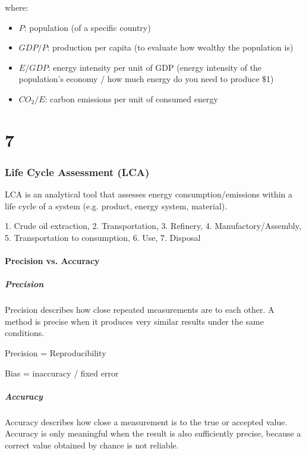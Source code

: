 \documentclass{article}
\begin{document}

where:
\begin{itemize}
    \item $P$: population (of a specific country)
    \item $GDP/P$: production per capita (to evaluate how wealthy the population is)
    \item $E/GDP$: energy intensity per unit of GDP (energy intensity of the population's economy / how much energy do you need to produce \$1)
    \item $CO_2/E$: carbon emissions per unit of consumed energy
\end{itemize}

\part{7}
\section{Life Cycle Assessment (LCA)}
LCA is an analytical tool that assesses energy consumption/emissions
within a life cycle of a system (e.g. product, energy system, material).

1. Crude oil extraction, 2. Transportation, 3. Refinery, 4. Manufactory/Assembly, 5. Transportation to consumption, 6. Use, 7. Disposal

\subsection{\color{red}Precision vs. Accuracy}

\subsubsection{Precision}
Precision describes how close repeated measurements are to each other.
A method is precise when it produces very similar results under the
same conditions.

Precision = Reproducibility

Bias = inaccuracy / fixed error

\subsubsection{Accuracy}
Accuracy describes how close a measurement is to the true or accepted
value. Accuracy is only meaningful when the result is also sufficiently
precise, because a correct value obtained by chance is not reliable.
\end{document}
